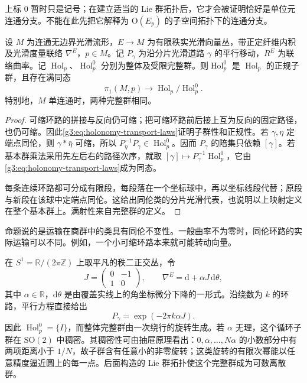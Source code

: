 上标 \(0\) 暂时只是记号；在建立适当的 Lie 群拓扑后，它才会被证明恰好是单位元连通分支。不能在此先把它解释为 \(\mathrm O(E_p)\) 的子空间拓扑下的连通分支。

\begin{proposition}\label{g3:prop:restricted-holonomy-normal}
	设 \(M\) 为连通无边界光滑流形，\(E\to M\) 为有限秩实光滑向量丛，带正定纤维内积及光滑度量联络 \(\nabla^E\)，\(p\in M\)。记 \(P_\gamma\) 为沿分片光滑道路 \(\gamma\) 的平行移动，\(R^E\) 为联络曲率。记 \(\operatorname{Hol}_p\)、\(\operatorname{Hol}_p^0\) 分别为整体及受限完整群。则\(\operatorname{Hol}_p^0\) 是 \(\operatorname{Hol}_p\) 的正规子群，且存在满同态
	\[
		\pi_1(M,p)\longrightarrow\operatorname{Hol}_p/\operatorname{Hol}_p^0.
	\]
	特别地，\(M\) 单连通时，两种完整群相同。
\end{proposition}
\begin{proof}
	可缩环路的拼接与反向仍可缩；把可缩环路前后接上互为反向的固定路径，也仍可缩。因此\eqref{g3:eq:holonomy-transport-laws}证明子群性和正规性。若 \(\gamma,\eta\) 定端点同伦，则 \(\gamma*\bar\eta\) 可缩，所以 \(P_\eta^{-1}P_\gamma\in\operatorname{Hol}_p^0\)。因而 \(P_\gamma\) 的陪集只依赖 \([\gamma]\)。若基本群乘法采用先左后右的路径次序，就取 \([\gamma]\mapsto P_\gamma^{-1}\operatorname{Hol}_p^0\)，它由\eqref{g3:eq:holonomy-transport-laws}成为同态。

	每条连续环路都可分成有限段，每段落在一个坐标球中，再以坐标线段代替；原段与新段在该球中定端点同伦。这给出同伦类的分片光滑代表，也说明以上映射定义在整个基本群上。满射性来自完整群的定义。
\end{proof}

命题说的是运输在商群中的类具有同伦不变性。一般曲率不为零时，同伦环路的实际运输可以不同。例如，一个小可缩环路本来就可能转动向量。

\begin{example}\label{g3:exm:dense-flat-holonomy}
	在 \(S^1=\mathbb R/(2\pi\mathbb Z)\) 上取平凡的秩二正交丛，令
	\[
		J=\begin{pmatrix}0&-1\\1&0\end{pmatrix},\qquad
		\nabla^E=\mathrm d+\alpha J\,\mathrm d\theta,
	\]
	其中 \(\alpha\in\mathbb R\)，\(\mathrm d\theta\) 是由覆盖实线上的角坐标微分下降的一形式。沿绕数为 \(k\) 的环路，平行方程直接给出
	\[
		P_\gamma=\exp(-2\pi k\alpha J).
	\]
	因此 \(\operatorname{Hol}_p^0=\{I\}\)，而整体完整群由一次绕行的旋转生成。若 \(\alpha\) 无理，这个循环子群在 \(\mathrm{SO}(2)\) 中稠密。其稠密性可由抽屉原理看出：\(0,\alpha,\ldots,N\alpha\) 的小数部分中有两项距离小于 \(1/N\)，故子群含有任意小的非零旋转；这类旋转的有限次幂能以任意精度逼近圆上的每一点。后面构造的 Lie 群拓扑使这个完整群成为可数离散群。
\end{example}

